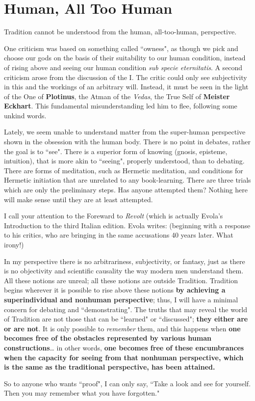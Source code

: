 \section{Human, All Too Human}

Tradition cannot be understood from the human, all-too-human, perspective. 

One criticism was based on something called ``owness", as though we pick and choose our gods on the basis of their suitability to our human condition, instead of rising above and seeing our human condition \emph{sub specie eternitatis}. A second criticism arose from the discussion of the I. The critic could only see subjectivity in this and the workings of an arbitrary will. Instead, it must be seen in the light of the One of \textbf{Plotinus}, the Atman of the \emph{Vedas}, the True Self of \textbf{Meister Eckhart}. This fundamental misunderstanding led him to flee, following some unkind words.

Lately, we seem unable to understand matter from the super-human perspective shown in the obsession with the human body. There is no point in debates, rather the goal is to ``see". There is a superior form of knowing (gnosis, episteme, intuition), that is more akin to ``seeing", properly understood, than to debating. There are forms of meditation, such as Hermetic meditation, and conditions for Hermetic initiation that are unrelated to any book-learning. There are three trials which are only the preliminary steps. Has anyone attempted them? Nothing here will make sense until they are at least attempted.

I call your attention to the Foreward to \emph{Revolt} (which is actually Evola's Introduction to the third Italian edition. Evola writes: (beginning with a response to his critics, who are bringing in the same accusations 40 years later. What irony!)

\begin{quotex}
In my perspective there is no arbitrariness, subjectivity, or fantasy, just as there is no objectivity and scientific causality the way modern men understand them. All these notions are unreal; all these notions are outside Tradition. Tradition begins wherever it is possible to rise above these notions \textbf{by achieving a superindividual and nonhuman perspective}; thus, I will have a minimal concern for debating and ``demonstrating". The truths that may reveal the world of Tradition are not those that can be ``learned" or ``discussed"; \textbf{they either are or are not}. It is only possible to \emph{remember} them, and this happens when \textbf{one becomes free of the obstacles represented by various human constructions}… in other words, \textbf{one becomes free of these encumbrances when the capacity for seeing from that nonhuman perspective, which is the same as the traditional perspective, has been attained.} 

\end{quotex}
So to anyone who wants ``proof", I can only say, ``Take a look and see for yourself. Then you may remember what you have forgotten."

